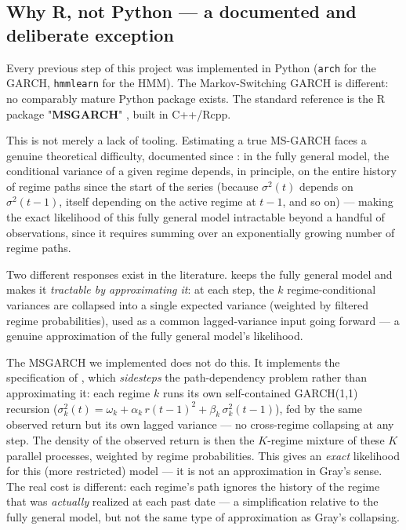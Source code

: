 \documentclass[12pt,a4paper]{article}
\begin{document}
\subsection{Why R, not Python --- a documented and \\deliberate exception}

Every previous step of this project was implemented in Python
(\texttt{arch} for the GARCH, \texttt{hmmlearn} for the HMM). The
Markov-Switching GARCH is different: no comparably
mature Python package exists. The standard reference is the R package
"\textbf{MSGARCH}"
\citep{ardia2019}, built in C++/Rcpp.

This is not merely a lack of tooling. Estimating a true
MS-GARCH faces a genuine theoretical difficulty, documented since
\citet{hamiltonsusmel1994}: in the fully general model, the
conditional variance of a given regime depends, in principle, on
the entire history of regime paths since the start of the series
(because $\sigma^2(t)$ depends on $\sigma^2(t-1)$, itself depending on
the active regime at $t-1$, and so on) --- making the exact
likelihood of this fully general model intractable beyond a
handful of observations, since it requires summing over an
exponentially growing number of regime paths.

Two different responses exist in the literature.
\citet{gray1996} keeps the fully general model and makes it
\emph{tractable by approximating it}: at each step, the $k$
regime-conditional variances are collapsed into a single
expected variance (weighted by filtered regime probabilities),
used as a common lagged-variance input going forward --- a genuine
approximation of the fully general model's likelihood.

The MSGARCH we implemented does not do this. It implements the \\specification of
\citet{haasmittnikpaolella2004}, which \emph{sidesteps} the
path-dependency problem rather than approximating it: each regime
$k$ runs its own self-contained GARCH(1,1) recursion
($\sigma_k^2(t) = \omega_k + \alpha_k\, r(t-1)^2 + \beta_k\,
\sigma_k^2(t-1)$), fed by the same observed return but its
own lagged variance --- no cross-regime collapsing at any
step. The density of the observed return is then the $K$-regime
mixture of these $K$ parallel processes, weighted by
regime probabilities. This gives an \emph{exact} likelihood
for this (more restricted) model --- it is not an approximation in
Gray's sense. The real cost is different: each regime's
path ignores the history of the regime that was \emph{actually}
realized at each past date --- a simplification relative to
the fully general model, but not the same type of approximation as
Gray's collapsing.
\end{document}
